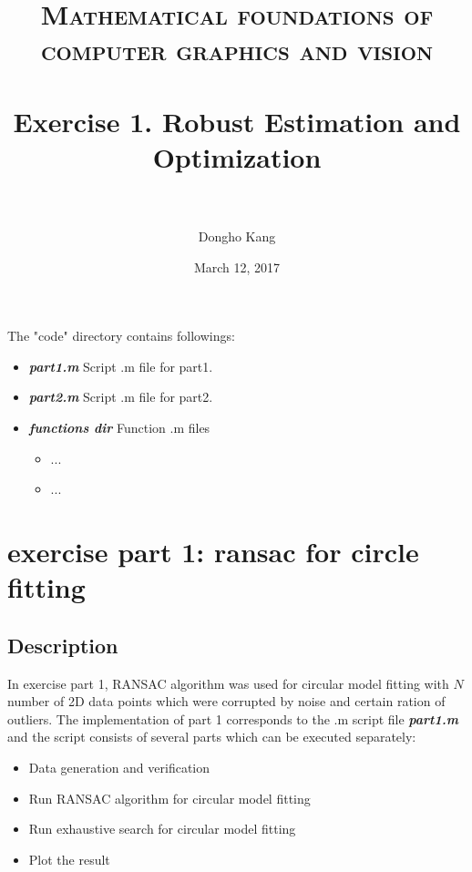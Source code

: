 \documentclass[paper=a4, fontsize=11pt]{scrartcl} %
\title{	
\normalfont \normalsize 
\textsc{Mathematical foundations of computer graphics and vision} \\ [25pt] %
\horrule{0.5pt} \\[0.4cm] %
\huge Exercise 1. Robust Estimation and Optimization \\ %
\horrule{2pt} \\[0.5cm] %
}
\author{Dongho Kang} %
\date{\normalsize March 12, 2017} %
\numberwithin{equation}{section} %
\numberwithin{figure}{section} %
\numberwithin{table}{section} %
\newcommand{\filename}[1]{\textbf{\textit{#1}}}
\begin{document}
\maketitle %


The "code" directory contains followings:

\begin{itemize}
	\item \filename{part1.m} \quad Script .m file for part1.
	\item \filename{part2.m} \quad Script .m file for part2.
	\item \filename{functions dir} \quad Function .m files 
		\begin{itemize}
			\item ...
			\item ...
		\end{itemize}
\end{itemize}


\section{exercise part 1: ransac for circle fitting}

\subsection{Description}

In exercise part 1, RANSAC algorithm was used for circular model fitting with $N$ number of 2D data points which were corrupted by noise and certain ration of outliers. The implementation of part 1 corresponds to the .m script file \filename{part1.m} and the script consists of several parts which can be executed separately: 

\begin{itemize}
\item Data generation and verification
\item Run RANSAC algorithm for circular model fitting
\item Run exhaustive search for circular model fitting
\item Plot the result
\end{itemize}  
\end{document}
